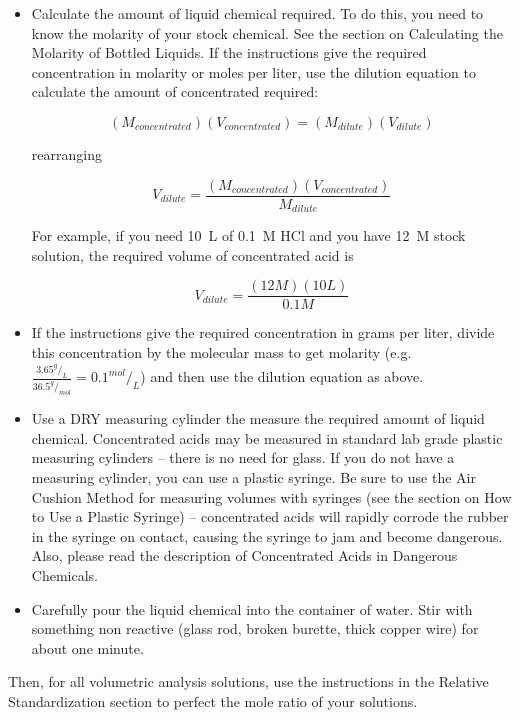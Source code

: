 \begin{itemize}

\item{Calculate the amount of liquid chemical required. To do this, you need to know the molarity of your stock chemical. See the section on Calculating the Molarity of Bottled Liquids. If the instructions give the required concentration in molarity or moles per liter, use the dilution equation to calculate the amount of concentrated required:

\[ (M_{concentrated})(V_{concentrated}) = (M_{dilute})(V_{dilute}) \]

rearranging

\[ V_{dilute} = \frac{(M_{concentrated})(V_{concentrated})}{M_{dilute}} \]

For example, if you need 10~L of 0.1~M HCl and you have 12~M stock solution, the required volume of concentrated acid is

\[ V_{dilute} = \frac{(12 M)(10 L)}{0.1 M} \]

}

\item{If the instructions give the required concentration in grams per liter, divide this concentration by the molecular mass to get molarity (e.g. $ \frac {3.65 ^g/_L}{36.5 ^g/_{mol}} = 0.1 ^{mol}/_L $) and then use the dilution equation as above.}

\item{Use a DRY measuring cylinder the measure the required amount of liquid chemical. Concentrated acids may be measured in standard lab grade plastic measuring cylinders – there is no need for glass. If you do not have a measuring cylinder, you can use a plastic syringe. Be sure to use the Air Cushion Method for measuring volumes with syringes (see the section on How to Use a Plastic Syringe) – concentrated acids will rapidly corrode the rubber in the syringe on contact, causing the syringe to jam and become dangerous. Also, please read the description of Concentrated Acids in Dangerous Chemicals.}

\item{Carefully pour the liquid chemical into the container of water. Stir with something non reactive (glass rod, broken burette, thick copper wire) for about one minute.}

\end{itemize}

Then, for all volumetric analysis solutions, use the instructions in the Relative Standardization section to perfect the mole ratio of your solutions.

